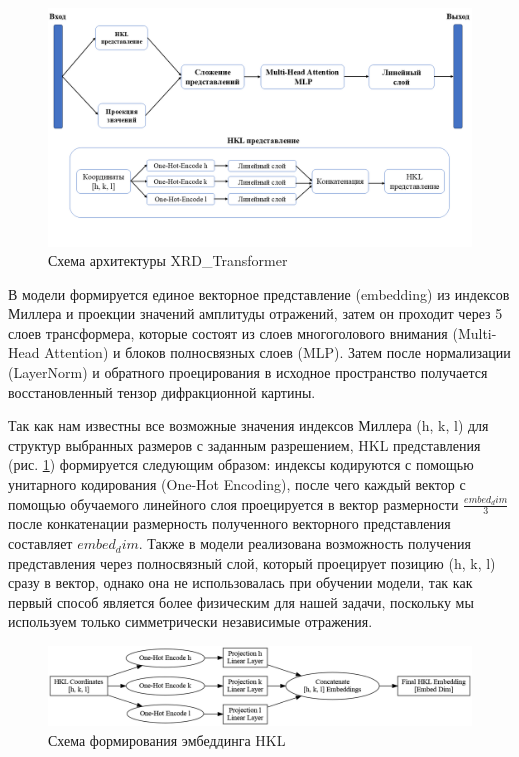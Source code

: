 \begin{figure}[H]
    \centering
    \includegraphics[width=1\textwidth]{figures/xrd_arch.png}
    \caption{Схема архитектуры XRD\_Transformer}
    \label{XRDTrans}
\end{figure}

В модели формируется единое векторное представление (embedding) из индексов Миллера и проекции значений амплитуды отражений, затем он проходит через 5 слоев трансформера, которые состоят из слоев многоголового внимания (Multi-Head Attention) и блоков полносвязных слоев (MLP). Затем после нормализации (LayerNorm) и обратного проецирования в исходное пространство получается восстановленный тензор дифракционной картины.

Так как нам известны все возможные значения индексов Миллера (h, k, l) для структур выбранных размеров с заданным разрешением, HKL представления (рис. \ref{XRDTrans}) формируется следующим образом: индексы кодируются с помощью унитарного кодирования (One-Hot Encoding), после чего каждый вектор с помощью обучаемого линейного слоя проецируется в вектор размерности $\frac{embed_dim}{3}$ после конкатенации размерность полученного векторного представления составляет $embed_dim$. Также в модели реализована возможность получения представления через полносвязный слой, который проецирует позицию (h, k, l) сразу в вектор, однако она не использовалась при обучении модели, так как первый способ является более физическим для нашей задачи, поскольку мы используем только симметрически независимые отражения.


\begin{figure}[H]
    \centering
    \includegraphics[width=1\textwidth]{figures/hkl_embedding_process.png}
    \caption{Схема формирования эмбеддинга HKL}
    \label{hklembed}
\end{figure}

